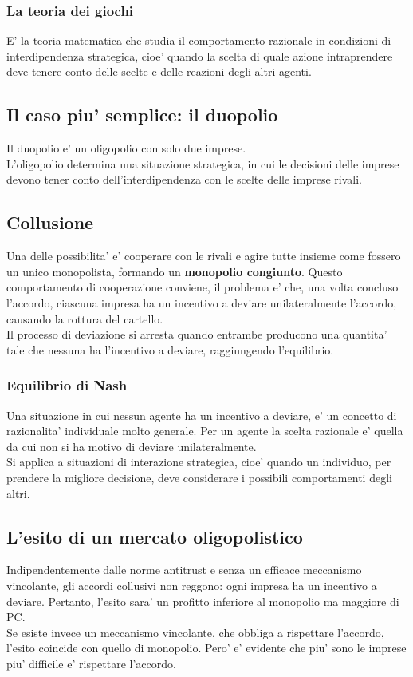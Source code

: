 \documentclass{report}
\begin{document}
	\subsubsection{La teoria dei giochi}
	E' la teoria matematica che studia il comportamento razionale in condizioni di interdipendenza strategica, cioe' quando la scelta di quale azione intraprendere deve tenere conto delle scelte e delle reazioni degli altri agenti.
	\subsection{Il caso piu' semplice: il duopolio}
	Il duopolio e' un oligopolio con solo due imprese.
	\medskip \\
	L'oligopolio determina una situazione strategica, in cui le decisioni delle imprese devono tener conto dell'interdipendenza con le scelte delle imprese rivali.
	\subsection{Collusione}
	Una delle possibilita' e' cooperare con le rivali e agire tutte insieme come fossero un unico monopolista, formando un \textbf{monopolio congiunto}. Questo comportamento di cooperazione conviene, il problema e' che, una volta concluso l'accordo, ciascuna impresa ha un incentivo a deviare unilateralmente l'accordo, causando la rottura del cartello.
	\medskip \\Il processo di deviazione si arresta quando entrambe producono una quantita' tale che nessuna ha l'incentivo a deviare, raggiungendo l'equilibrio.
	\subsubsection{Equilibrio di Nash}
	Una situazione in cui nessun agente ha un incentivo a deviare, e' un concetto di razionalita' individuale molto generale. Per un agente la scelta razionale e' quella da cui non si ha motivo di deviare unilateralmente.
	\medskip \\Si applica a situazioni di interazione strategica, cioe' quando un individuo, per prendere la migliore decisione, deve considerare i possibili comportamenti degli altri.
	\subsection{L'esito di un mercato oligopolistico}
	Indipendentemente dalle norme antitrust e senza un efficace meccanismo vincolante, gli accordi collusivi non reggono: ogni impresa ha un incentivo a deviare. Pertanto, l'esito sara' un profitto inferiore al monopolio ma maggiore di PC.
	\medskip \\Se esiste invece un meccanismo vincolante, che obbliga a rispettare l'accordo, l'esito coincide con quello di monopolio. Pero' e' evidente che piu' sono le imprese piu' difficile e' rispettare l'accordo.
\end{document}
